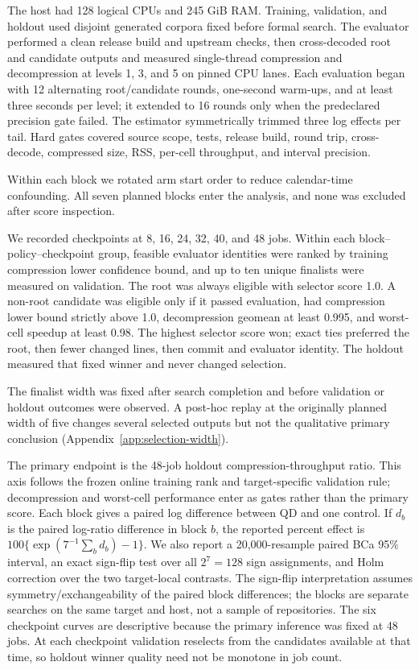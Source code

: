 \documentclass[10pt,twocolumn]{article}
\begin{document}
The host had 128 logical CPUs and 245 GiB RAM. Training, validation, and
holdout used disjoint generated corpora fixed before formal search. The
evaluator performed a clean release build and upstream checks, then cross-decoded
root and candidate outputs and measured single-thread compression and
decompression at levels 1, 3, and 5 on pinned CPU lanes. Each evaluation began
with 12 alternating root/candidate rounds, one-second warm-ups, and at least
three seconds per level; it extended to 16 rounds only when the predeclared
precision gate failed. The estimator symmetrically trimmed three log effects
per tail. Hard gates covered source scope, tests, release build, round trip,
cross-decode, compressed size, RSS, per-cell throughput, and interval precision.

Within each block we rotated arm start order to reduce calendar-time
confounding. All seven planned blocks enter the analysis, and none was excluded
after score inspection.

We recorded checkpoints at 8, 16, 24, 32, 40, and 48 jobs. Within each
block--policy--checkpoint group, feasible evaluator identities were ranked by
training compression lower confidence bound, and up to ten unique finalists
were measured on validation. The root was always eligible with selector score
1.0. A non-root candidate was eligible only if it passed evaluation, had
compression lower bound strictly above 1.0, decompression geomean at least
0.995, and worst-cell speedup at least 0.98. The highest selector score won;
exact ties preferred the root, then fewer changed lines, then commit and
evaluator identity. The holdout measured that fixed winner and never changed
selection.

The finalist width was fixed after search completion and before validation or
holdout outcomes were observed. A post-hoc replay at the originally planned
width of five changes several selected outputs but not the qualitative primary
conclusion (Appendix~\ref{app:selection-width}).

The primary endpoint is the 48-job holdout compression-throughput ratio. This
axis follows the frozen online training rank and target-specific validation
rule; decompression and worst-cell performance enter as gates rather than the
primary score. Each block gives a paired log difference between QD and one
control. If $d_b$ is the paired log-ratio difference in block $b$, the reported
percent effect is $100\{\exp(7^{-1}\sum_b d_b)-1\}$. We also report a
20,000-resample paired BCa 95\% interval, an exact sign-flip test over all
$2^7=128$ sign assignments,
and Holm correction over the two target-local contrasts. The sign-flip
interpretation assumes symmetry/exchangeability of the paired block
differences; the blocks are separate searches on the same target and host, not
a sample of repositories. The six checkpoint curves are descriptive because
the primary inference was fixed at 48 jobs. At each checkpoint validation
reselects from the candidates available at that time, so holdout winner quality
need not be monotone in job count.
\end{document}
